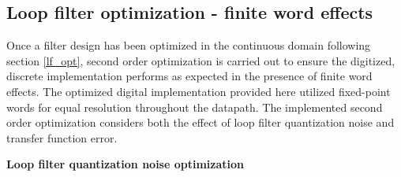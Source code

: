 \subsection{Loop filter optimization - finite word effects}
Once a filter design has been optimized in the continuous domain following section \ref{lf_opt}, second order optimization is carried out to ensure the digitized, discrete implementation performs as expected in the presence of finite word effects. The optimized digital implementation provided here utilized fixed-point words for equal resolution throughout the datapath. The implemented second order optimization considers both the effect of loop filter quantization noise and transfer function error.

\textbf{Loop filter quantization noise optimization}

